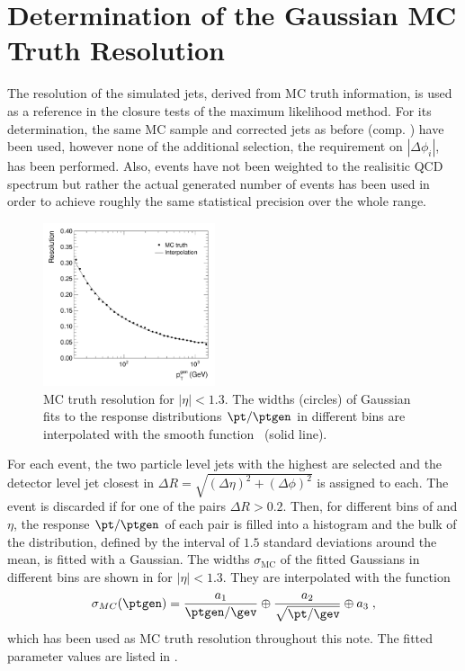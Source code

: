 \section{Determination of the Gaussian MC Truth Resolution}\label{sec:ResFit:App:MCTruth}

The resolution of the simulated jets, derived from MC truth information, is used as a reference in the closure tests of the maximum likelihood method.
For its determination, the same MC sample and corrected jets as before (comp. ) have
been used, however none of the additional selection, \eg the requirement
on $|\Delta\phi_{i}|$, has been performed.
Also, events have not been weighted to the realisitic QCD spectrum but
rather the actual generated number of events has been used in order
to achieve roughly the same statistical precision over the whole \pt range.

\begin{figure}[ht]
  \centering
  \includegraphics[width=0.45\textwidth]{figures/hMCTruthReso}
  \caption{MC truth resolution for \mbox{$|\eta| < 1.3$}.
  The widths (circles) of Gaussian fits to the response distributions
  \mbox{$\pt/\ptgen$} in different \ptgen bins are interpolated with the
  smooth function~ (solid line).}
  \label{fig:ResFit:App:MCTruthReso}
\end{figure}

For each event, the two particle level jets with the highest \ptgen
are selected and the detector level jet closest in
\mbox{$\Delta R = \sqrt{(\Delta\eta)^{2} + (\Delta\phi)^{2}}$} is assigned to each.
The event is discarded if for one of the pairs $\Delta R > 0.2$.
Then, for different bins of \ptgen and $\eta$, the response $\pt/\ptgen$ of each pair is filled into a
histogram and the bulk of the distribution, defined by the interval of
$1.5$ standard deviations around the mean, is fitted with a Gaussian.
The widths $\sigma_{\text{MC}}$ of the fitted Gaussians in different \ptgen
bins are shown in  for \mbox{$|\eta| < 1.3$}.
They are interpolated with the function
\begin{equation}
  \label{eq:ResFit:MCTruthReso}
  \sigma_{MC}(\ptgen) = \frac{a_{1}}{\ptgen/\gev} \oplus
  \frac{a_{2}}{\sqrt{\pt/\gev}} \oplus a_{3} \; ,
\end{equation}
which has been used as MC truth resolution throughout this note.
The fitted parameter values are listed in .

